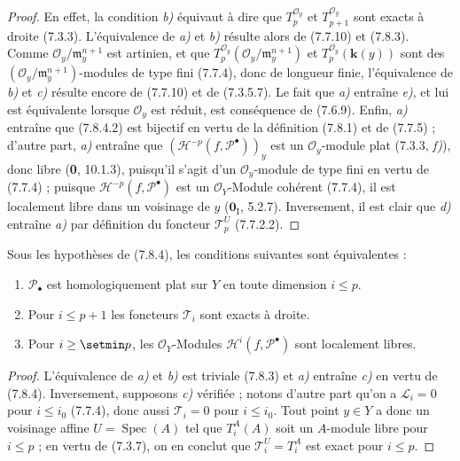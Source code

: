 \begin{proof}
En effet, la condition \emph{b)} équivaut à dire que $T_p^{\mathscr O_y}$ et
$T_{p+1}^{\mathscr O_y}$ sont exacts à droite (7.3.3). L'équivalence de \emph{a)} et \emph{b)}
résulte alors de (7.7.10) et (7.8.3). Comme
$\mathscr O_y/\mathfrak m_y^{n+1}$ est artinien, et que
$T_p^{\mathscr O_y}(\mathscr O_y/\mathfrak m_y^{n+1})$ et
$T_p^{\mathscr O_y}(\boldsymbol{k}(y))$ sont des
$(\mathscr O_y/\mathfrak m_y^{n+1})$-modules de type fini (7.7.4), donc de
longueur finie, l'équivalence de \emph{b)} et \emph{c)} résulte encore de (7.7.10) et de
(7.3.5.7). Le fait que \emph{a)} entraîne \emph{e)}, et lui est équivalente lorsque
$\mathscr O_y$ est réduit, est conséquence de (7.6.9). Enfin, \emph{a)} entraîne que
(7.8.4.2) est bijectif en vertu de la définition (7.8.1) et de (7.7.5) ; d'autre
part, \emph{a)} entraîne que $(\mathcal H^{-p}(f,\mathscr P^\bullet))_y$ est un
$\mathscr O_y$-module plat (7.3.3, \emph{f)}), donc libre (\textbf{0}, 10.1.3),
puisqu'il s'agit d'un $\mathscr O_y$-module de type fini en vertu de (7.7.4) ;
puisque $\mathcal H^{-p}(f,\mathscr P^\bullet)$ est un $\mathscr O_Y$-Module
cohérent (7.7.4), il est localement libre dans un voisinage de $y$
($\mathbf{0}_{\mathrm I}$, 5.2.7). Inversement, il est clair que \emph{d)} entraîne \emph{a)} par
définition du foncteur $\mathscr T_p^U$ (7.7.2.2).
\end{proof}

\begin{proposition}[7.8.5]
Sous les hypothèses de \textup{(7.8.4)}, les conditions suivantes sont équivalentes :
\begin{enumerate}
  \item[\textup{a)}] $\mathscr P_\bullet$ est homologiquement plat sur $Y$ en toute
    dimension $i\leq p$.
  \item[\textup{b)}] Pour $i\leq p+1$ les foncteurs $\mathscr T_i$ sont exacts à droite.
  \item[\textup{c)}] Pour $i\geq\setmin p$, les $\mathscr O_Y$-Modules
    $\mathcal H^i(f,\mathscr P^\bullet)$ sont localement libres.
\end{enumerate}
\end{proposition}

\begin{proof}
L'équivalence de \emph{a)} et \emph{b)} est triviale (7.8.3) et \emph{a)} entraîne \emph{c)} en vertu de
(7.8.4). Inversement, supposons \emph{c)} vérifiée ; notons d'autre part qu'on a
$\mathscr L_i=0$ pour $i\leq i_0$ (7.7.4), donc aussi $\mathscr T_i=0$ pour
$i\leq i_0$. Tout point $y\in Y$ a donc un voisinage affine
$U=\operatorname{Spec}(A)$ tel que $T_i^A(A)$ soit un $A$-module libre pour
$i\leq p$ ; en vertu de (7.3.7), on en conclut que
$\mathscr T_i^U=T_i^A$ est exact pour $i\leq p$.
\end{proof}

